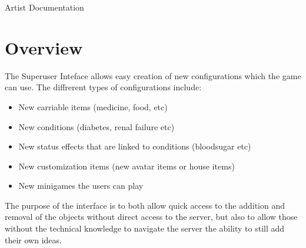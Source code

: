 \documentclass[a4paper,12pt]{article}
\begin{document}
\begin{center}
{\Huge Artist Documentation}
\end{center}

\section{Overview}

The Superuser Inteface allows easy creation of new configurations which the game can use.
The diffrerent types of configurations include:
\begin{itemize}
	\item New carriable items (medicine, food, etc)
	\item New conditions (diabetes, renal failure etc)
	\item New status effects that are linked to conditions (bloodsugar etc)
	\item New customization items (new avatar items or house items)
	\item New minigames the users can play
\end{itemize}

The purpose of the interface is to both allow quick access to the addition and removal of the objects without
direct access to the server, but also to allow those without the technical knowledge to navigate the server the
ability to still add their own ideas.	
\end{document}

